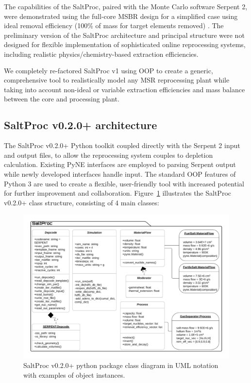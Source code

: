 \documentclass[12pt]{article} %
\begin{document}
The capabilities of the SaltProc, paired with the Monte Carlo software 
Serpent 2, were demonstrated using the full-core MSBR design for a simplified  
case using ideal removal efficiency (100\% of mass for target elements 
removed) \cite{rykhlevskii_modeling_2019}. The preliminary version of the 
SaltProc architecture and principal structure were not designed for flexible 
implementation of sophisticated online reprocessing systems, including 
realistic physics/chemistry-based extraction efficiencies. 

We completely re-factored SaltProc v1 using \gls{OOP} to create a generic, 
comprehensive tool to realistically model any \gls{MSR} reprocessing plant 
while taking into account non-ideal or variable extraction efficiencies and 
mass balance between the core and processing plant.

\subsection{SaltProc v0.2.0+ architecture}
The SaltProc v0.2.0+ Python toolkit coupled directly with the Serpent 2 input 
and output files, to allow the reprocessing system couples to depletion 
calculation. Existing PyNE interfaces are employed to parsing Serpent output  
while newly developed interfaces handle input. The standard \gls{OOP} features 
of Python 3 are used to create a flexible, user-friendly tool with increased  
potential for further improvement and collaboration.  
Figure~\ref{fig:saltproc_class} illustrates the SaltProc v0.2.0+ class 
structure, consisting of 4 main classes:
\begin{figure}[ht!] %
  \includegraphics[width=1.07\textwidth]{saltproc_class_diagram.png}
  	  	\vspace{-0.35in}
  \caption{SaltProc v0.2.0+ python package class diagram in UML notation with  
  examples of object instances.}
  \label{fig:saltproc_class}
\end{figure}
\end{document}
